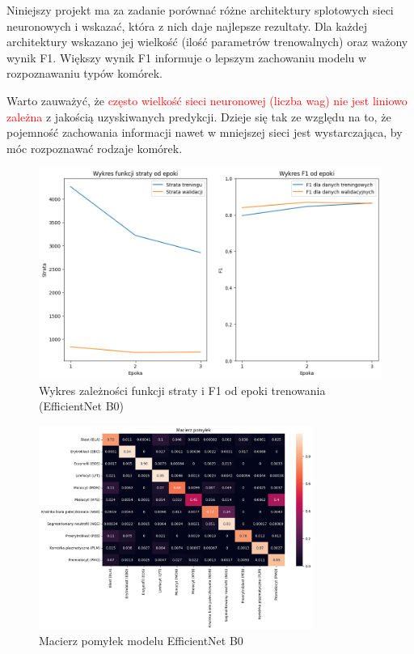 Niniejszy projekt ma za zadanie porównać różne architektury splotowych sieci neuronowych i wskazać, która z nich daje najlepsze rezultaty.
Dla każdej architektury wskazano jej wielkość (ilość parametrów trenowalnych) oraz ważony wynik F1.
Większy wynik F1 informuje o lepszym zachowaniu modelu w rozpoznawaniu typów komórek.

Warto zauważyć, że \textcolor{red}{często wielkość sieci neuronowej (liczba wag)} \textcolor{red}{nie jest liniowo zależna} z jakością uzyskiwanych predykcji.
Dzieje się tak ze względu na to, że pojemność zachowania informacji nawet w mniejszej sieci jest wystarczająca, by móc rozpoznawać rodzaje komórek.

\begin{figure}
    \centering
    \includegraphics[width=\textwidth]{experiments/efficientnet_b0/combined}
    \caption{Wykres zależności funkcji straty i F1 od epoki trenowania (EfficientNet B0)}
    \label{fig:plot_efficientnet_b0}
\end{figure}
\begin{figure}
    \centering
    \includegraphics[width=0.8\textwidth]{experiments/efficientnet_b0/confusion_matrix}
    \caption{Macierz pomyłek modelu EfficientNet B0}
    \label{fig:confusion_efficientnet_b0}
\end{figure}

